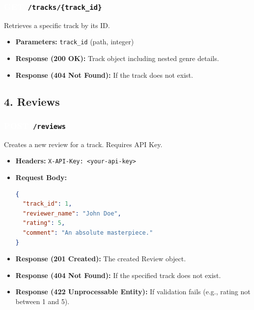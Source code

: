\documentclass[11pt,a4paper]{article}
\newcommand{\methodGET}{\colorbox{getcolor}{\textcolor{white}{\textbf{GET}}}}
\newcommand{\methodPOST}{\colorbox{postcolor}{\textcolor{white}{\textbf{POST}}}}
\begin{document}
\subsubsection*{\methodGET \texttt{ /tracks/\{track\_id\}}}
Retrieves a specific track by its ID.
\begin{itemize}[label=\textcolor{primary}{\textbullet}, noitemsep]
    \item \textbf{Parameters:} \texttt{track\_id} (path, integer)
    \item \textbf{Response (200 OK):} Track object including nested genre details.
    \item \textbf{Response (404 Not Found):} If the track does not exist.
\end{itemize}

\subsection{4. Reviews}

\subsubsection*{\methodPOST \texttt{ /reviews}}
Creates a new review for a track. Requires API Key.
\begin{itemize}[label=\textcolor{primary}{\textbullet}, noitemsep]
    \item \textbf{Headers:} \texttt{X-API-Key: <your-api-key>}
    \item \textbf{Request Body:}
\begin{lstlisting}[language=json]
{
  "track_id": 1,
  "reviewer_name": "John Doe",
  "rating": 5,
  "comment": "An absolute masterpiece."
}
\end{lstlisting}
    \item \textbf{Response (201 Created):} The created Review object.
    \item \textbf{Response (404 Not Found):} If the specified track does not exist.
    \item \textbf{Response (422 Unprocessable Entity):} If validation fails (e.g., rating not between 1 and 5).
\end{itemize}
\end{document}

